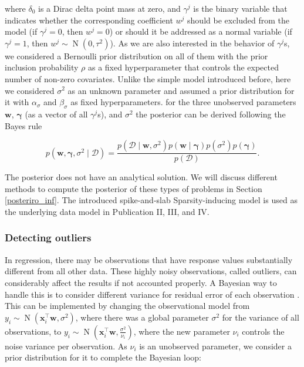 \documentclass[dissertation,math,vertlayout,pdfa,colorlinks]{aaltoseries}
\newcommand{\bw}{\bm{w}}
\newcommand{\bD}{\mathcal{D}}
\DeclareMathOperator{\normalpdf}{N}
\newcommand{\tp}{^{\top}}
\begin{document}
\noindent where $\delta_0$ is a Dirac delta point mass at zero, and $\gamma^j$ is the binary variable that indicates whether the corresponding coefficient $w^j$ should be excluded from the model (if $\gamma^j=0$, then $w^j=0$) or should it be addressed as a normal variable (if $\gamma^j=1$, then $w^j \sim \normalpdf(0, \tau^2)$). As we are also interested in the behavior of $\gamma^j$s, we considered a Bernoulli prior distribution on all of them with the prior inclusion probability $\rho$ as a fixed hyperparameter that controls the expected number of non-zero covariates. Unlike the simple model introduced before, here we considered $\sigma^{2}$ as an unknown parameter and assumed a prior distribution for it with $\alpha_{\sigma}$ and $\beta_{\sigma}$ as fixed hyperparameters. for the three unobserved parameters $\bw$, $\bm{\gamma}$ (as a vector of all $\gamma^j$s), and $\sigma^2$ the posterior can be derived following the Bayes rule

\begin{equation}\label{Eq:Bayes_rule_ss_reg}
p(\bw, \bm{\gamma}, \sigma^2 \mid \bD) = \frac{p(\bD \mid \bw, \sigma^2)p(\bw \mid \bm{\gamma})p(\sigma^2)p(\bm{\gamma})}{p(\bD)}.
\end{equation} 

The posterior does not have an analytical solution. We will discuss different methods to compute the posterior of these types of problems in Section \ref{posteriro_inf}. The introduced spike-and-slab Sparsity-inducing model is used as the underlying data model in Publication II, III, and IV. 


\subsubsection{Detecting outliers}

In regression, there may be observations that have response values substantially different from all other data. These highly noisy observations, called outliers, can considerably affect the results if not accounted properly. A Bayesian way to handle this is to consider different variance for residual error of each observation \cite{Bayesian_ARD2007,Kangasraasio_2016_interactive}. This can be implemented by changing the observational model from $y_i\sim \normalpdf(\bm{x}_i\tp\bw,\sigma^2)$, where there was a global parameter $\sigma^2$ for the variance of all observations, to $y_i \sim \normalpdf(\bm{x}_i\tp\bw,\frac{\sigma^2}{\nu_i})$, where the new parameter $\nu_i$ controls the noise variance per observation. As $\nu_i$ is an unobserved parameter, we consider a prior distribution for it to complete the Bayesian loop:
\end{document}
